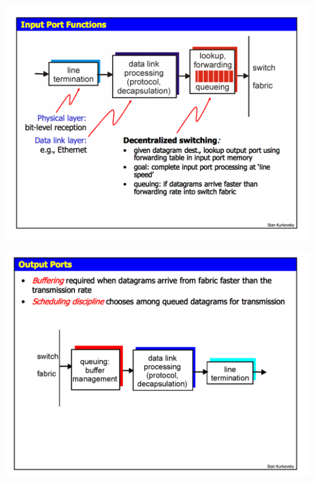 {{{\includegraphics{4-network-layer/router-input-port}
{\includegraphics{4-network-layer/router-output-port.png}

}}}}
